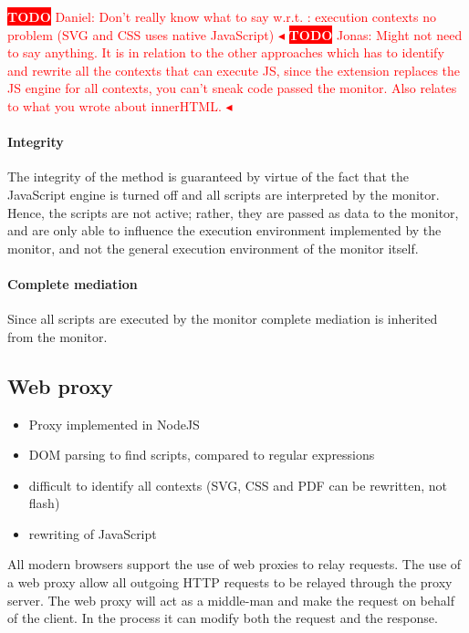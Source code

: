 \documentclass{llncs}
\newcommand{\todo}[1]{\colorbox{red}{\textcolor{white}{\sffamily\bfseries\scriptsize TODO}} \textcolor{red}{#1} \textcolor{red}{$\blacktriangleleft$}}
\begin{document}
\todo{Daniel: Don't really know what to say w.r.t. : execution contexts no problem (SVG and CSS uses native JavaScript)}
\todo{Jonas: Might not need to say anything. It is in relation to the other approaches 
which has to identify and rewrite all the contexts that can execute JS, since the 
extension replaces the JS engine for all contexts, you can't sneak code passed the monitor. Also relates to what you wrote about innerHTML.}

\paragraph{Integrity} The integrity of the method is guaranteed by virtue of
the fact that the JavaScript engine is turned off and all scripts are
interpreted by the monitor. Hence, the scripts are not active; rather, they are
passed as data to the monitor, and are only able to influence the execution
environment implemented by the monitor, and not the general execution
environment of the monitor itself.

\paragraph{Complete mediation}

Since all scripts are executed by the monitor complete mediation is inherited 
from the monitor.


\subsection{Web proxy}

\begin{itemize}
\item Proxy implemented in NodeJS
\item DOM parsing to find scripts, compared to regular expressions
\item difficult to identify all contexts (SVG, CSS and PDF can be rewritten, not flash)
\item rewriting of JavaScript
\end{itemize}

All modern browsers support the use of web proxies to relay requests.
The use of a web proxy allow all outgoing HTTP requests to be 
relayed through the proxy server. The web proxy will act as a middle-man and make 
the request on behalf of the client. In the process it can modify both the 
request and the response. 
\end{document}

